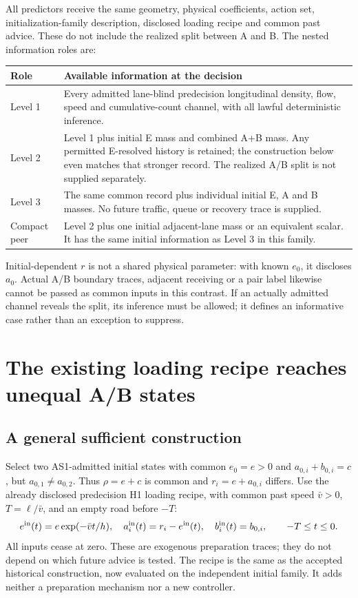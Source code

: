 \documentclass[11pt,a4paper]{article}
\begin{document}
All predictors receive the same geometry, physical coefficients, action
set, initialization-family description, disclosed loading recipe and common
past advice. These do not include the realized split between A and B.
The nested information roles are:
\begin{center}\small
\begin{tabular}{p{24mm}p{122mm}}
\toprule
Role & Available information at the decision\\
\midrule
Level 1 & Every admitted lane-blind predecision longitudinal density, flow,
speed and cumulative-count channel, with all lawful deterministic inference.\\[4pt]
Level 2 & Level 1 plus initial E mass and combined A+B mass. Any permitted
E-resolved history is retained; the construction below even matches that
stronger record. The realized A/B split is not supplied separately.\\[4pt]
Level 3 & The same common record plus individual initial E, A and B masses.
No future traffic, queue or recovery trace is supplied.\\[4pt]
Compact peer & Level 2 plus one initial adjacent-lane mass or an equivalent
scalar. It has the same initial information as Level 3 in this family.\\
\bottomrule
\end{tabular}\end{center}
Initial-dependent $r$ is not a shared physical parameter: with known $e_0$,
it discloses $a_0$. Actual A/B boundary traces, adjacent receiving or a pair
label likewise cannot be passed as common inputs in this contrast. If an
actually admitted channel reveals the split, its inference must be allowed;
it defines an informative case rather than an exception to suppress.

\section{The existing loading recipe reaches unequal A/B states}
\subsection{A general sufficient construction}
Select two AS1-admitted initial states with common $e_0=e>0$ and
$a_{0,i}+b_{0,i}=c$, but $a_{0,1}\ne a_{0,2}$. Thus
$\rho=e+c$ is common and $r_i=e+a_{0,i}$ differs. Use the already disclosed
predecision H1 loading recipe, with common past speed $\bar v>0$,
$T=\ell/\bar v$, and an empty road before $-T$:
\begin{equation}
 e^{\rm in}(t)=e\exp(-\bar vt/h),\quad
 a_i^{\rm in}(t)=r_i-e^{\rm in}(t),\quad
 b_i^{\rm in}(t)=b_{0,i},\qquad -T\leq t\leq0.
 \label{eq:loader}
\end{equation}
All inputs cease at zero. These are exogenous preparation traces; they do
not depend on which future advice is tested. The recipe is the same as the
accepted historical construction, now evaluated on the independent initial
family. It adds neither a preparation mechanism nor a new controller.
\end{document}
